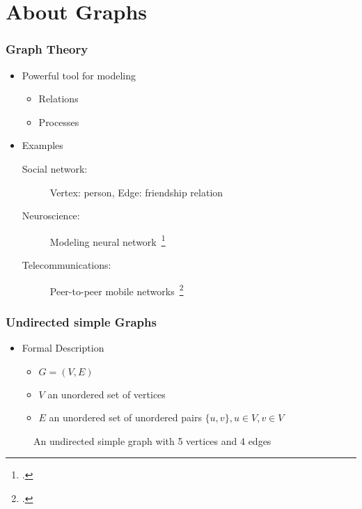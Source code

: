 \section{About Graphs}
\begin{frame}
	\frametitle{Graph Theory}
	\begin{itemize}
		\item Powerful tool for modeling
			\begin{itemize}
				\item Relations
				\item Processes
			\end{itemize}
		\item Examples
			\begin{description}
				\item [Social network:] Vertex: person, Edge: friendship relation
				\item [Neuroscience:] Modeling neural network~\footcite{BuSp09}
				\item [Telecommunications:] Peer-to-peer mobile networks~\footcite{FaCh99}
			\end{description}
	\end{itemize}
\end{frame}

\begin{frame}
	\frametitle{Undirected simple Graphs}
	\begin{itemize}
		\item Formal Description
			\begin{itemize}
				\item $G = (V,E)$
				\item $V$ an unordered set of vertices
				\item $E$ an unordered set of unordered pairs $\{u,v\}, u \in V, v \in V$
			\end{itemize}
	\end{itemize}
	\begin{figure}
		\begin{center}
			
		\end{center}
		\caption{An undirected simple graph with 5 vertices and 4 edges}
	\end{figure}
\end{frame}


